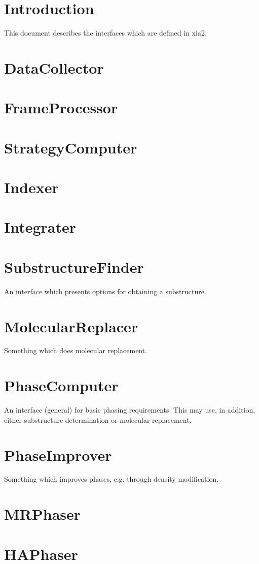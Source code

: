 \documentclass[a4paper, 11pt]{article}
\begin{document}
\section{Introduction}

This document describes the interfaces which are defined in xia2.

\section{DataCollector}

\section{FrameProcessor}

\section{StrategyComputer}

\section{Indexer}

\section{Integrater}

\section{SubstructureFinder}

An interface which presents options for obtaining a substructure.

\section{MolecularReplacer}

Something which does molecular replacement.

\section{PhaseComputer}

An interface (general) for basic phasing requirements. This may use, in 
addition, either substructure determination or molecular replacement.

\section{PhaseImprover}

Something which improves phases, e.g. through density modification.

\section{MRPhaser}

\section{HAPhaser}
\end{document}
